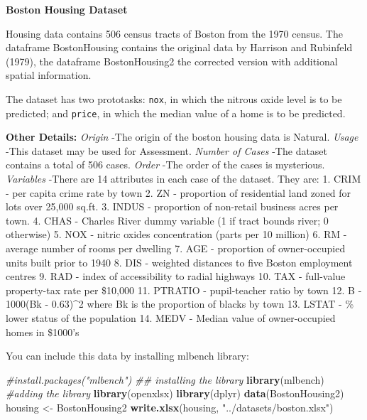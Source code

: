 \documentclass[
]{book}
\newenvironment{Shaded}{\begin{snugshade}}{\end{snugshade}}
\newcommand{\CommentTok}[1]{\textcolor[rgb]{0.56,0.35,0.01}{\textit{#1}}}
\newcommand{\FunctionTok}[1]{\textcolor[rgb]{0.13,0.29,0.53}{\textbf{#1}}}
\newcommand{\NormalTok}[1]{#1}
\newcommand{\OtherTok}[1]{\textcolor[rgb]{0.56,0.35,0.01}{#1}}
\newcommand{\StringTok}[1]{\textcolor[rgb]{0.31,0.60,0.02}{#1}}
\begin{document}
\textbf{Boston Housing Dataset}

Housing data contains 506 census tracts of Boston from the 1970 census. The dataframe BostonHousing contains the original data by Harrison and Rubinfeld (1979), the dataframe BostonHousing2 the corrected version with additional spatial information.

The dataset has two prototasks: \texttt{nox}, in which the nitrous oxide level is to be predicted; and \texttt{price}, in which the median value of a home is to be predicted.

\textbf{Other Details:}
\emph{Origin}
-The origin of the boston housing data is Natural.
\emph{Usage}
-This dataset may be used for Assessment.
\emph{Number of Cases}
-The dataset contains a total of 506 cases.
\emph{Order}
-The order of the cases is mysterious.
\emph{Variables}
-There are 14 attributes in each case of the dataset. They are:
1. CRIM - per capita crime rate by town
2. ZN - proportion of residential land zoned for lots over 25,000 sq.ft.
3. INDUS - proportion of non-retail business acres per town.
4. CHAS - Charles River dummy variable (1 if tract bounds river; 0 otherwise)
5. NOX - nitric oxides concentration (parts per 10 million)
6. RM - average number of rooms per dwelling
7. AGE - proportion of owner-occupied units built prior to 1940
8. DIS - weighted distances to five Boston employment centres
9. RAD - index of accessibility to radial highways
10. TAX - full-value property-tax rate per \$10,000
11. PTRATIO - pupil-teacher ratio by town
12. B - 1000(Bk - 0.63)\^{}2 where Bk is the proportion of blacks by town
13. LSTAT - \% lower status of the population
14. MEDV - Median value of owner-occupied homes in \$1000's

You can include this data by installing mlbench library:

\begin{Shaded}
\begin{Highlighting}[]
\CommentTok{\#install.packages("mlbench") \#\# installing the library}
\FunctionTok{library}\NormalTok{(mlbench) }\CommentTok{\#adding the library}
\FunctionTok{library}\NormalTok{(openxlsx)}
\FunctionTok{library}\NormalTok{(dplyr)}
\FunctionTok{data}\NormalTok{(BostonHousing2)}
\NormalTok{housing }\OtherTok{\textless{}{-}}\NormalTok{ BostonHousing2}
\FunctionTok{write.xlsx}\NormalTok{(housing, }\StringTok{"../datasets/boston.xlsx"}\NormalTok{)}
\end{Highlighting}
\end{Shaded}
\end{document}
